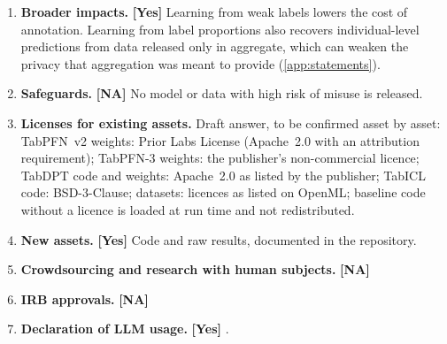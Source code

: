 \begin{enumerate}
\item \textbf{Broader impacts.} \textbf{[Yes]} Learning from weak labels lowers the cost of annotation. Learning from label
proportions also recovers individual-level predictions from data released only in aggregate, which can weaken the
privacy that aggregation was meant to provide (\cref{app:statements}).
\item \textbf{Safeguards.} \textbf{[NA]} No model or data with high risk of misuse is released.
\item \textbf{Licenses for existing assets.}  Draft answer, to be confirmed asset by asset: TabPFN~v2 weights: Prior Labs
License (Apache~2.0 with an attribution requirement); TabPFN-3 weights: the publisher's non-commercial licence; TabDPT
code and weights: Apache~2.0 as listed by the publisher; TabICL code: BSD-3-Clause; datasets: licences as listed on OpenML;
baseline code without a licence is loaded at run time and not redistributed.
\item \textbf{New assets.} \textbf{[Yes]} Code and raw results, documented in the repository.
\item \textbf{Crowdsourcing and research with human subjects.} \textbf{[NA]}
\item \textbf{IRB approvals.} \textbf{[NA]}
\item \textbf{Declaration of LLM usage.} \textbf{[Yes]} .
\end{enumerate}
